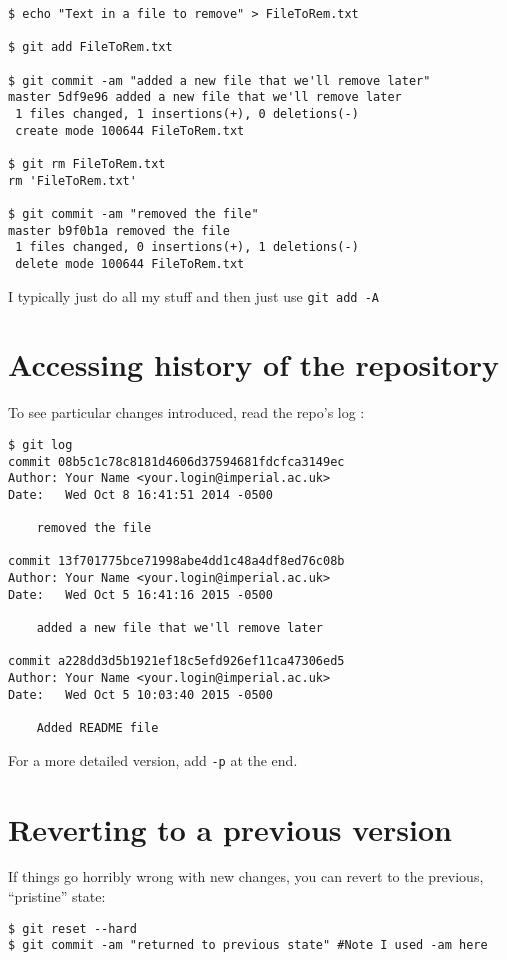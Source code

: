 \begin{lstlisting} 
$ echo "Text in a file to remove" > FileToRem.txt

$ git add FileToRem.txt

$ git commit -am "added a new file that we'll remove later"
master 5df9e96 added a new file that we'll remove later
 1 files changed, 1 insertions(+), 0 deletions(-)
 create mode 100644 FileToRem.txt

$ git rm FileToRem.txt
rm 'FileToRem.txt'

$ git commit -am "removed the file"
master b9f0b1a removed the file
 1 files changed, 0 insertions(+), 1 deletions(-)
 delete mode 100644 FileToRem.txt
\end{lstlisting}
  
I typically just do all my stuff and then just use {\tt git add -A}  

\section{Accessing history of the repository}

To see particular changes introduced, read the repo's log :

\begin{lstlisting} 
$ git log
commit 08b5c1c78c8181d4606d37594681fdcfca3149ec
Author: Your Name <your.login@imperial.ac.uk>
Date:   Wed Oct 8 16:41:51 2014 -0500

    removed the file

commit 13f701775bce71998abe4dd1c48a4df8ed76c08b
Author: Your Name <your.login@imperial.ac.uk>
Date:   Wed Oct 5 16:41:16 2015 -0500

    added a new file that we'll remove later

commit a228dd3d5b1921ef18c5efd926ef11ca47306ed5
Author: Your Name <your.login@imperial.ac.uk>
Date:   Wed Oct 5 10:03:40 2015 -0500

    Added README file
\end{lstlisting}

For a more detailed version, add {\tt -p} at the end.
  
\section{Reverting to a previous version}

If things go horribly wrong with new changes, you can revert to the 
previous, ``pristine'' state:

\begin{lstlisting} 
$ git reset --hard
$ git commit -am "returned to previous state" #Note I used -am here
\end{lstlisting}

